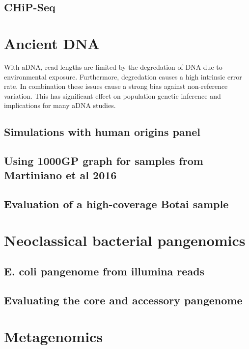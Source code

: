 \subsection{CHiP-Seq}


\section{Ancient DNA}
With aDNA, read lengths are limited by the degredation of DNA due to environmental exposure.
Furthermore, degredation causes a high intrinsic error rate.
In combination these issues cause a strong bias against non-reference variation.
This has significant effect on population genetic inference and implications for many aDNA studies.

\subsection{Simulations with human origins panel}

\subsection{Using 1000GP graph for samples from Martiniano et al 2016}

\subsection{Evaluation of a high-coverage Botai sample}


\section{Neoclassical bacterial pangenomics}

\subsection{E. coli pangenome from illumina reads}

\subsection{Evaluating the core and accessory pangenome}


\section{Metagenomics}

